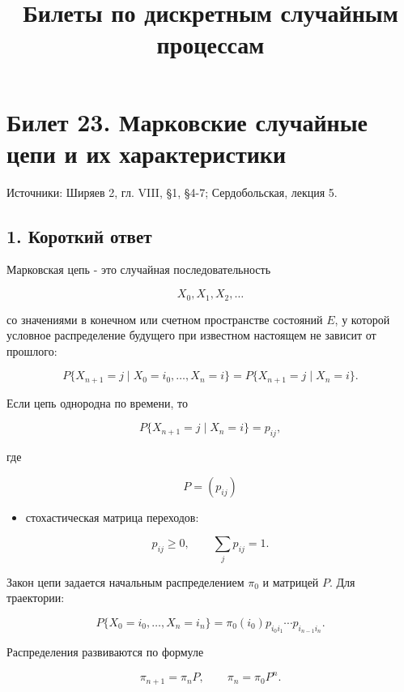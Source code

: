 \documentclass[
  11pt,
  a4paper,
]{article}
\title{Билеты по дискретным случайным процессам}
\author{}
\date{}
\providecommand{\tightlist}{%
  \setlength{\itemsep}{0pt}\setlength{\parskip}{0pt}}
\begin{document}
\maketitle

\section{Билет 23. Марковские случайные цепи и их
характеристики}\label{ux431ux438ux43bux435ux442-23.-ux43cux430ux440ux43aux43eux432ux441ux43aux438ux435-ux441ux43bux443ux447ux430ux439ux43dux44bux435-ux446ux435ux43fux438-ux438-ux438ux445-ux445ux430ux440ux430ux43aux442ux435ux440ux438ux441ux442ux438ux43aux438}

Источники: Ширяев 2, гл. VIII, §1, §4-7; Сердобольская, лекция 5.

\subsection{1. Короткий
ответ}\label{ux43aux43eux440ux43eux442ux43aux438ux439-ux43eux442ux432ux435ux442}

Марковская цепь - это случайная последовательность

\[
X_0,X_1,X_2,\ldots
\]

со значениями в конечном или счетном пространстве состояний \(E\), у
которой условное распределение будущего при известном настоящем не
зависит от прошлого:

\[
P\{X_{n+1}=j\mid X_0=i_0,\ldots,X_n=i\}
=
P\{X_{n+1}=j\mid X_n=i\}.
\]

Если цепь однородна по времени, то

\[
P\{X_{n+1}=j\mid X_n=i\}=p_{ij},
\]

где

\[
P=(p_{ij})
\]

\begin{itemize}
\tightlist
\item
  стохастическая матрица переходов:
\end{itemize}

\[
p_{ij}\ge0,
\qquad
\sum_jp_{ij}=1.
\]

Закон цепи задается начальным распределением \(\pi_0\) и матрицей \(P\).
Для траектории:

\[
P\{X_0=i_0,\ldots,X_n=i_n\}
=
\pi_0(i_0)p_{i_0i_1}\cdots p_{i_{n-1}i_n}.
\]

Распределения развиваются по формуле

\[
\pi_{n+1}=\pi_nP,
\qquad
\pi_n=\pi_0P^n.
\]
\end{document}
